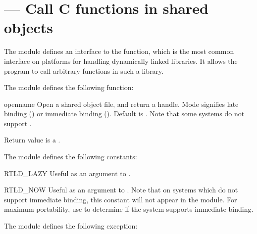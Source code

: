 \section{ ---
         Call C functions in shared objects}

The  module defines an interface to the
 function, which is the most common interface on
\UNIX{} platforms for handling dynamically linked libraries. It allows
the program to call arbitrary functions in such a library.



The  module defines the following function:

\begin{funcdesc}{open}{name}
Open a shared object file, and return a handle. Mode
signifies late binding () or immediate binding
(). Default is . Note that some
systems do not support .

Return value is a .
\end{funcdesc}

The  module defines the following constants:

\begin{datadesc}{RTLD_LAZY}
Useful as an argument to .
\end{datadesc}

\begin{datadesc}{RTLD_NOW}
Useful as an argument to .  Note that on systems
which do not support immediate binding, this constant will not appear
in the module. For maximum portability, use  to
determine if the system supports immediate binding.
\end{datadesc}

The  module defines the following exception:

